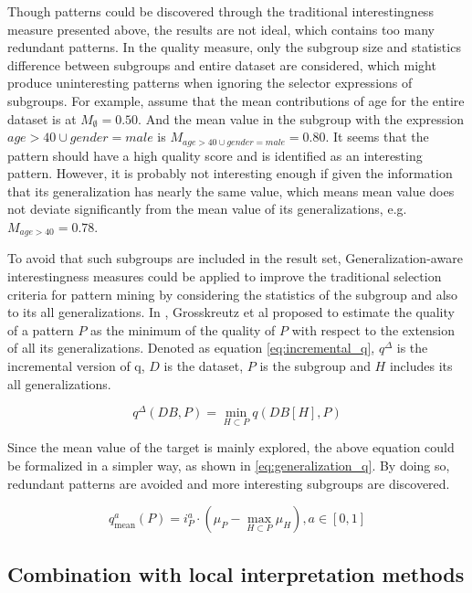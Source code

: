 Though patterns could be discovered through the traditional interestingness measure presented above, the results are not ideal, which contains too many redundant patterns. In the quality measure, only the subgroup size and statistics difference between subgroups and entire dataset are considered, which might produce uninteresting patterns when ignoring the selector expressions of subgroups. For example, assume that the mean contributions of age for the entire dataset is at $M_{\emptyset}=0.50$. And the mean value in the subgroup with the expression $age > 40 \cup gender=male$ is $M_{age > 40 \cup gender=male}=0.80$. It seems that the pattern should have a high quality score and is identified as an interesting pattern. However, it is probably not interesting enough if given the information that its generalization has nearly the same value, which means mean value does not deviate significantly from the mean value of its generalizations, e.g. $M_{age > 40} = 0.78$. 

To avoid that such subgroups are included in the result set, Generalization-aware interestingness measures could be applied to improve the traditional selection criteria for pattern mining by considering the statistics of the subgroup and also to its all generalizations. In \cite{grosskreutz2010subgroup}, Grosskreutz et al proposed to estimate the quality of a pattern $P$ as the minimum of the quality of $P$ with respect to the extension of all its generalizations. Denoted as equation \ref{eq:incremental_q}, $q^{\Delta}$ is the incremental version of q, $D$ is the dataset, $P$ is the subgroup and $H$ includes its all generalizations. 

\begin{equation} \label{eq:incremental_q}
q^{\Delta}(D B, P)=\min _{H \subset P} q\left(D B\left[H\right], P\right)
\end{equation}

Since the mean value of the target is mainly explored, the above equation could be formalized in a simpler way, as shown in \ref{eq:generalization_q}. By doing so, redundant patterns are avoided and more interesting subgroups are discovered. 

\begin{equation} \label{eq:generalization_q}
q_{\operatorname{mean}}^{a}(P)=i_{P}^{a} \cdot\left(\mu_{P}-\max _{H \subset P} \mu_{H}\right), a \in[0,1]
\end{equation}

\subsection{Combination with local interpretation methods}

